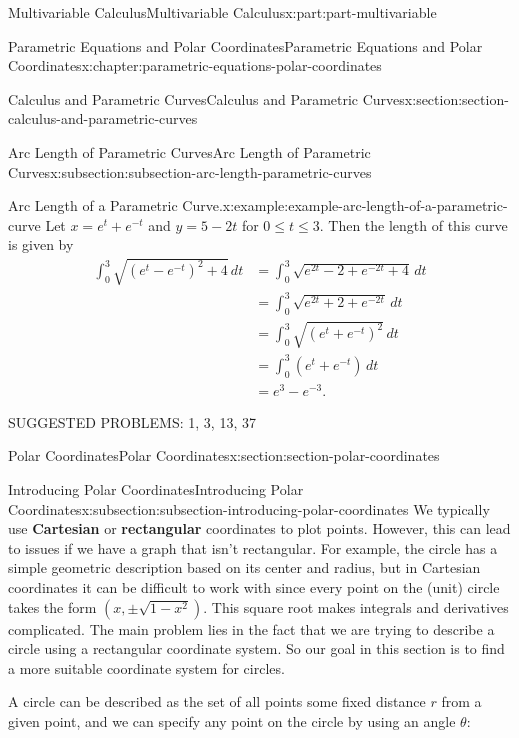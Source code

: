 \documentclass[twoside,10pt,]{tufte-book}
\newcommand{\terminology}[1]{\textbf{#1}}
\numberwithin{equation}{part}
\newcommand{\amp}{&}
\begin{document}
\begin{partptx}{Multivariable Calculus}{}{Multivariable Calculus}{}{}{x:part:part-multivariable}
\begin{chapterptx}{Parametric Equations and Polar Coordinates}{}{Parametric Equations and Polar Coordinates}{}{}{x:chapter:parametric-equations-polar-coordinates}
\begin{sectionptx}{Calculus and Parametric Curves}{}{Calculus and Parametric Curves}{}{}{x:section:section-calculus-and-parametric-curves}
\begin{subsectionptx}{Arc Length of Parametric Curves}{}{Arc Length of Parametric Curves}{}{}{x:subsection:subsection-arc-length-parametric-curves}
\begin{equation*}
\end{equation*}
\begin{example}{Arc Length of a Parametric Curve.}{x:example:example-arc-length-of-a-parametric-curve}%
Let \(x = e^{t}+e^{-t}\) and \(y = 5-2t\) for \(0\leq t\leq 3.\) Then the length of this curve is given by%
%
\begin{align*}
\int_{0}^{3}\sqrt{(e^{t}-e^{-t})^{2} + 4}\,dt \amp = \int_{0}^{3}\sqrt{e^{2t}-2 + e^{-2t} + 4}\,dt \\
\amp = \int_{0}^{3}\sqrt{e^{2t} + 2 + e^{-2t}}\,dt \\
\amp = \int_{0}^{3}\sqrt{(e^{t}+e^{-t})^{2}}\,dt \\
\amp = \int_{0}^{3}(e^{t}+e^{-t})\,dt\\
\amp = e^{3}-e^{-3}.
\end{align*}
\end{example}
SUGGESTED PROBLEMS: 1, 3, 13, 37%
\end{subsectionptx}
\end{sectionptx}
%
%
\typeout{************************************************}
\typeout{************************************************}
%
\begin{sectionptx}{Polar Coordinates}{}{Polar Coordinates}{}{}{x:section:section-polar-coordinates}
%
%
\typeout{************************************************}
\typeout{************************************************}
%
\begin{subsectionptx}{Introducing Polar Coordinates}{}{Introducing Polar Coordinates}{}{}{x:subsection:subsection-introducing-polar-coordinates}
We typically use \terminology{Cartesian} or \terminology{rectangular} coordinates to plot points. However, this can lead to issues if we have a graph that isn't rectangular. For example, the circle has a simple geometric description based on its center and radius, but in Cartesian coordinates it can be difficult to work with since every point on the (unit) circle takes the form \((x,\pm\sqrt{1-x^{2}})\). This square root makes integrals and derivatives complicated. The main problem lies in the fact that we are trying to describe a circle using a rectangular coordinate system. So our goal in this section is to find a more suitable coordinate system for circles.%
\par
A circle can be described as the set of all points some fixed distance \(r\) from a given point, and we can specify any point on the circle by using an angle \(\theta\):%

\end{subsectionptx}
\end{sectionptx}
\end{chapterptx}
\end{partptx}
\end{document}
